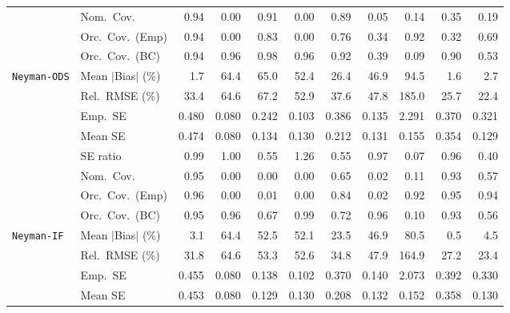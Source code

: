 \begin{landscape}
\begin{longtable}{llrrrrrrrrr}
 & Nom.\ Cov. & \cellcolor{rankone}0.94 & 0.00 & \cellcolor{ranktwo}0.91 & 0.00 & \cellcolor{rankthree}0.89 & 0.05 & 0.14 & 0.35 & 0.19 \\
 & Orc.\ Cov.\ (Emp) & \cellcolor{rankone}0.94 & 0.00 & \cellcolor{rankthree}0.83 & 0.00 & 0.76 & 0.34 & \cellcolor{ranktwo}0.92 & 0.32 & 0.69 \\
 & Orc.\ Cov.\ (BC) & \cellcolor{rankone}0.94 & \cellcolor{rankone}0.96 & \cellcolor{ranktwo}0.98 & \cellcolor{rankone}0.96 & \cellcolor{ranktwo}0.92 & 0.39 & 0.09 & \cellcolor{rankthree}0.90 & 0.53 \\
\addlinespace[2pt]
\quad \texttt{Neyman-ODS} & Mean $|$Bias$|$ (\%) & \cellcolor{ranktwo}1.7 & 64.4 & 65.0 & 52.4 & 26.4 & 46.9 & 94.5 & \cellcolor{rankone}1.6 & \cellcolor{rankthree}2.7 \\
 & Rel.\ RMSE (\%) & \cellcolor{rankthree}33.4 & 64.6 & 67.2 & 52.9 & 37.6 & 47.8 & 185.0 & \cellcolor{ranktwo}25.7 & \cellcolor{rankone}22.4 \\
 & Emp.\ SE & 0.480 & 0.080 & 0.242 & 0.103 & 0.386 & 0.135 & 2.291 & 0.370 & 0.321 \\
 & Mean SE & 0.474 & 0.080 & 0.134 & 0.130 & 0.212 & 0.131 & 0.155 & 0.354 & 0.129 \\
 & SE ratio & \cellcolor{ranktwo}0.99 & \cellcolor{rankone}1.00 & 0.55 & 1.26 & 0.55 & \cellcolor{rankthree}0.97 & 0.07 & 0.96 & 0.40 \\
 & Nom.\ Cov. & \cellcolor{rankone}0.95 & 0.00 & 0.00 & 0.00 & \cellcolor{rankthree}0.65 & 0.02 & 0.11 & \cellcolor{ranktwo}0.93 & 0.57 \\
 & Orc.\ Cov.\ (Emp) & \cellcolor{ranktwo}0.96 & 0.00 & 0.01 & 0.00 & 0.84 & 0.02 & \cellcolor{rankthree}0.92 & \cellcolor{rankone}0.95 & \cellcolor{ranktwo}0.94 \\
 & Orc.\ Cov.\ (BC) & \cellcolor{rankone}0.95 & \cellcolor{ranktwo}0.96 & 0.67 & 0.99 & 0.72 & \cellcolor{ranktwo}0.96 & 0.10 & \cellcolor{rankthree}0.93 & 0.56 \\
\addlinespace[2pt]
\quad \texttt{Neyman-IF} & Mean $|$Bias$|$ (\%) & \cellcolor{ranktwo}3.1 & 64.4 & 52.5 & 52.1 & 23.5 & 46.9 & 80.5 & \cellcolor{rankone}0.5 & \cellcolor{rankthree}4.5 \\
 & Rel.\ RMSE (\%) & \cellcolor{rankthree}31.8 & 64.6 & 53.3 & 52.6 & 34.8 & 47.9 & 164.9 & \cellcolor{ranktwo}27.2 & \cellcolor{rankone}23.4 \\
 & Emp.\ SE & 0.455 & 0.080 & 0.138 & 0.102 & 0.370 & 0.140 & 2.073 & 0.392 & 0.330 \\
 & Mean SE & 0.453 & 0.080 & 0.129 & 0.130 & 0.208 & 0.132 & 0.152 & 0.358 & 0.130 \\

\end{longtable}
\end{landscape}
